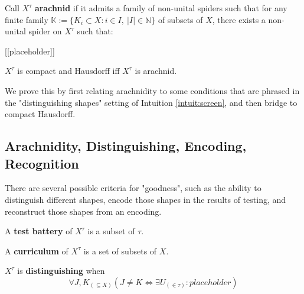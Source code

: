 \begin{defn}[Arachnidity]
Call $X^\tau$ \textbf{arachnid} if it admits a family of non-unital spiders such that for any finite family $\mathbb{K}:=\{K_i \subset X : i \in I, \ |I| \in \mathbb{N}\}$ of subsets of $X$, there exists a non-unital spider on $X^\tau$ such that:

[[placeholder]]

\end{defn}

\begin{theorem}
$X^\tau$ is compact and Hausdorff iff $X^\tau$ is arachnid.
\end{theorem}

We prove this by first relating arachnidity to some conditions that are phrased in the "distinguishing shapes" setting of Intuition \ref{intuit:screen}, and then bridge to compact Hausdorff.

\subsection{Arachnidity, Distinguishing, Encoding, Recognition}

 There are several possible criteria for "goodness", such as the ability to distinguish different shapes, encode those shapes in the results of testing, and reconstruct those shapes from an encoding.

\begin{defn}
A \textbf{test battery} of $X^\tau$ is a subset of $\tau$.
\end{defn}
\begin{defn}[Curriculum]
A \textbf{curriculum} of $X^\tau$ is a set of subsets of $X$.
\end{defn}

\begin{defn}[Distinguishing]\label{def:distinguish}
$X^\tau$ is \textbf{distinguishing} when
\[\forall J,K_{(\subseteq X)} (J \neq K \iff \exists U_{(\in \tau)}: placeholder)\]
\end{defn}

